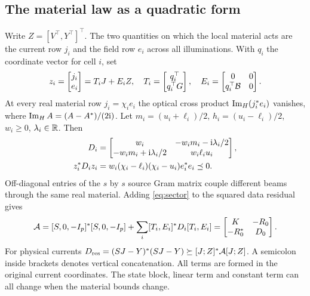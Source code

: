 \subsection{The material law as a quadratic form}
Write $Z=[V^\top,Y^\top]^\top$. The two quantities on which the local material acts are the current row $j_i$ and the field row $e_i$ across all illuminations. With $q_i$ the coordinate vector for cell $i$, set
\begin{equation}
 z_i=\begin{bmatrix}j_i\\e_i\end{bmatrix}=T_iJ+E_iZ,\quad
 T_i=\begin{bmatrix}q_i^\top\\q_i^\top G\end{bmatrix},\quad
 E_i=\begin{bmatrix}0&0\\q_i^\top\mathcal B&0\end{bmatrix}.
 \label{eq:trace}
\end{equation}
At every real material row $j_i=\chi_i e_i$ the optical cross product $\operatorname{Im}_{H}(j_i^*e_i)$ vanishes, where $\operatorname{Im}_{H} A=(A-A^*)/(2{\rm i})$.
Let $m_i=(u_i+\ell_i)/2$, $h_i=(u_i-\ell_i)/2$, $w_i\geq0$, $\lambda_i\in\mathbb R$. Then
\begin{align}
 D_i&=\begin{bmatrix}w_i&-w_i m_i-{\rm i}\lambda_i/2\\
                     -w_i m_i+{\rm i}\lambda_i/2&w_i\ell_i u_i\end{bmatrix},\notag\\
 z_i^*D_i z_i&=w_i(\chi_i-\ell_i)(\chi_i-u_i)e_i^*e_i\preceq0 .
 \label{eq:sector}
\end{align}
Off-diagonal entries of the $s$ by $s$ source Gram matrix couple different beams through the same real material. Adding \eqref{eq:sector} to the squared data residual gives
\begin{equation}
 \mathcal A=[S,0,-I_p]^*[S,0,-I_p]+\sum_i[T_i,E_i]^*D_i[T_i,E_i]
   =\begin{bmatrix}K&-R_0\\-R_0^*&D_0\end{bmatrix}.
 \label{eq:form}
\end{equation}
For physical currents $D_{\rm res}=(SJ-Y)^*(SJ-Y)\succeq[J;Z]^*\mathcal A[J;Z]$. A semicolon inside brackets denotes vertical concatenation. All terms are formed in the original current coordinates. The state block, linear term and constant term can all change when the material bounds change.

